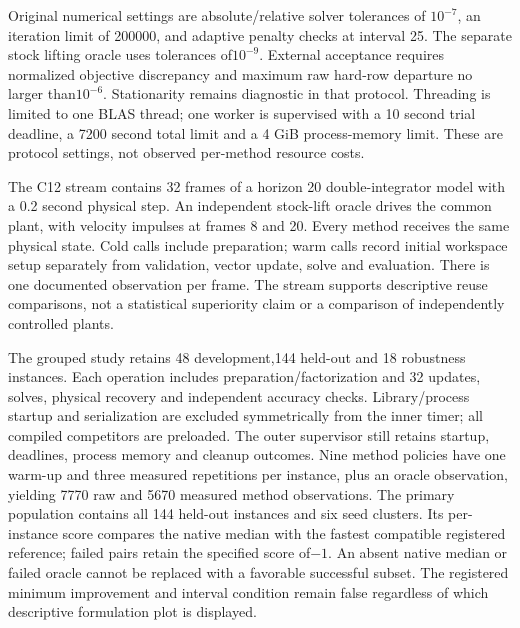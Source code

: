 Original numerical settings are absolute/relative solver tolerances of
$10^{-7}$, an iteration limit of 200000, and adaptive penalty checks at interval 25.
The separate stock lifting oracle uses tolerances of$10^{-9}$. External acceptance
requires normalized objective discrepancy and maximum raw hard-row departure
no larger than$10^{-6}$. Stationarity remains diagnostic in that protocol.
Threading is limited to one BLAS thread; one worker is supervised with a 10 second
trial deadline, a 7200 second total limit and a 4 GiB process-memory limit.
These are protocol settings, not observed per-method resource costs.

The C12 stream contains 32 frames of a horizon 20 double-integrator model with
a 0.2 second physical step. An independent stock-lift oracle drives the common
plant, with velocity impulses at frames 8 and 20. Every method receives the
same physical state. Cold calls include preparation; warm calls record
initial workspace setup separately from validation, vector update, solve
and evaluation. There is one documented observation per frame. The stream
supports descriptive reuse comparisons, not a statistical superiority claim
or a comparison of independently controlled plants.

The grouped study retains 48 development,144 held-out and 18 robustness instances.
Each operation includes preparation/factorization and 32 updates, solves,
physical recovery and independent accuracy checks. Library/process startup
and serialization are excluded symmetrically from the inner timer; all
compiled competitors are preloaded. The outer supervisor still retains
startup, deadlines, process memory and cleanup outcomes. Nine method policies
have one warm-up and three measured repetitions per instance, plus an oracle
observation, yielding 7770 raw and 5670 measured method observations. The primary
population contains all 144 held-out instances and six seed clusters. Its
per-instance score compares the native median with the fastest compatible
registered reference; failed pairs retain the specified score of$-1$.
An absent native median or failed oracle cannot be replaced with a favorable
successful subset. The registered minimum improvement and interval condition
remain false regardless of which descriptive formulation plot is displayed.
